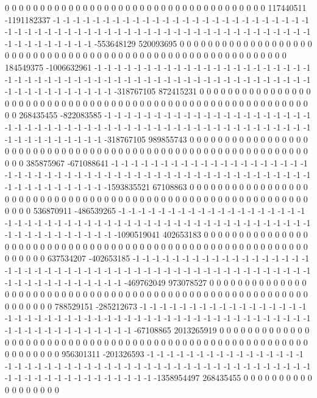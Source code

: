 0 0 0 0 0 0 0 0 0 0 0 0 0 0 0 0 0 0 0 0 0 0 0 0 0 0 0 0 0 0 0 0 0 0 0 0 0 117440511 -1191182337 -1 -1 -1 -1 -1 -1 -1 -1 -1 -1 -1 -1 -1 -1 -1 -1 -1 -1 -1 -1 -1 -1 -1 -1 -1 -1 -1 -1 -1 -1 -1 -1 -1 -1 -1 -1 -1 -1 -1 -1 -1 -1 -1 -1 -1 -1 -1 -1 -1 -1 -1 -1 -1 -1 -1 -1 -1 -1 -1 -1 -1 -1 -1 -1 -1 -1 -553648129 520093695 0 0 0 0 0 0 0 0 0 0 0 0 0 0 0 0 0 0 0 0 0
0 0 0 0 0 0 0 0 0 0 0 0 0 0 0 0 0 0 0 0 0 0 0 0 0 0 0 0 0 0 0 0 0 0 0 0 0 0 184549375 -1006632961 -1 -1 -1 -1 -1 -1 -1 -1 -1 -1 -1 -1 -1 -1 -1 -1 -1 -1 -1 -1 -1 -1 -1 -1 -1 -1 -1 -1 -1 -1 -1 -1 -1 -1 -1 -1 -1 -1 -1 -1 -1 -1 -1 -1 -1 -1 -1 -1 -1 -1 -1 -1 -1 -1 -1 -1 -1 -1 -1 -1 -1 -1 -1 -1 -318767105 872415231 0 0 0 0 0 0 0 0 0 0 0 0 0 0 0 0 0 0 0 0 0 0
0 0 0 0 0 0 0 0 0 0 0 0 0 0 0 0 0 0 0 0 0 0 0 0 0 0 0 0 0 0 0 0 0 0 0 0 0 0 0 268435455 -822083585 -1 -1 -1 -1 -1 -1 -1 -1 -1 -1 -1 -1 -1 -1 -1 -1 -1 -1 -1 -1 -1 -1 -1 -1 -1 -1 -1 -1 -1 -1 -1 -1 -1 -1 -1 -1 -1 -1 -1 -1 -1 -1 -1 -1 -1 -1 -1 -1 -1 -1 -1 -1 -1 -1 -1 -1 -1 -1 -1 -1 -1 -1 -318767105 989855743 0 0 0 0 0 0 0 0 0 0 0 0 0 0 0 0 0 0 0 0 0 0 0
0 0 0 0 0 0 0 0 0 0 0 0 0 0 0 0 0 0 0 0 0 0 0 0 0 0 0 0 0 0 0 0 0 0 0 0 0 0 0 0 385875967 -671088641 -1 -1 -1 -1 -1 -1 -1 -1 -1 -1 -1 -1 -1 -1 -1 -1 -1 -1 -1 -1 -1 -1 -1 -1 -1 -1 -1 -1 -1 -1 -1 -1 -1 -1 -1 -1 -1 -1 -1 -1 -1 -1 -1 -1 -1 -1 -1 -1 -1 -1 -1 -1 -1 -1 -1 -1 -1 -1 -1 -1 -1 -1593835521 67108863 0 0 0 0 0 0 0 0 0 0 0 0 0 0 0 0 0 0 0 0 0 0 0
0 0 0 0 0 0 0 0 0 0 0 0 0 0 0 0 0 0 0 0 0 0 0 0 0 0 0 0 0 0 0 0 0 0 0 0 0 0 0 0 0 536870911 -486539265 -1 -1 -1 -1 -1 -1 -1 -1 -1 -1 -1 -1 -1 -1 -1 -1 -1 -1 -1 -1 -1 -1 -1 -1 -1 -1 -1 -1 -1 -1 -1 -1 -1 -1 -1 -1 -1 -1 -1 -1 -1 -1 -1 -1 -1 -1 -1 -1 -1 -1 -1 -1 -1 -1 -1 -1 -1 -1 -1 -1 -1 -1090519041 402653183 0 0 0 0 0 0 0 0 0 0 0 0 0 0 0 0 0 0 0 0 0 0
0 0 0 0 0 0 0 0 0 0 0 0 0 0 0 0 0 0 0 0 0 0 0 0 0 0 0 0 0 0 0 0 0 0 0 0 0 0 0 0 0 0 637534207 -402653185 -1 -1 -1 -1 -1 -1 -1 -1 -1 -1 -1 -1 -1 -1 -1 -1 -1 -1 -1 -1 -1 -1 -1 -1 -1 -1 -1 -1 -1 -1 -1 -1 -1 -1 -1 -1 -1 -1 -1 -1 -1 -1 -1 -1 -1 -1 -1 -1 -1 -1 -1 -1 -1 -1 -1 -1 -1 -1 -1 -1 -1 -469762049 973078527 0 0 0 0 0 0 0 0 0 0 0 0 0 0 0 0 0 0 0 0 0
0 0 0 0 0 0 0 0 0 0 0 0 0 0 0 0 0 0 0 0 0 0 0 0 0 0 0 0 0 0 0 0 0 0 0 0 0 0 0 0 0 0 0 788529151 -285212673 -1 -1 -1 -1 -1 -1 -1 -1 -1 -1 -1 -1 -1 -1 -1 -1 -1 -1 -1 -1 -1 -1 -1 -1 -1 -1 -1 -1 -1 -1 -1 -1 -1 -1 -1 -1 -1 -1 -1 -1 -1 -1 -1 -1 -1 -1 -1 -1 -1 -1 -1 -1 -1 -1 -1 -1 -1 -1 -1 -1 -1 -67108865 2013265919 0 0 0 0 0 0 0 0 0 0 0 0 0 0 0 0 0 0 0 0
0 0 0 0 0 0 0 0 0 0 0 0 0 0 0 0 0 0 0 0 0 0 0 0 0 0 0 0 0 0 0 0 0 0 0 0 0 0 0 0 0 0 0 0 956301311 -201326593 -1 -1 -1 -1 -1 -1 -1 -1 -1 -1 -1 -1 -1 -1 -1 -1 -1 -1 -1 -1 -1 -1 -1 -1 -1 -1 -1 -1 -1 -1 -1 -1 -1 -1 -1 -1 -1 -1 -1 -1 -1 -1 -1 -1 -1 -1 -1 -1 -1 -1 -1 -1 -1 -1 -1 -1 -1 -1 -1 -1 -1 -1 -1358954497 268435455 0 0 0 0 0 0 0 0 0 0 0 0 0 0 0 0 0 0
